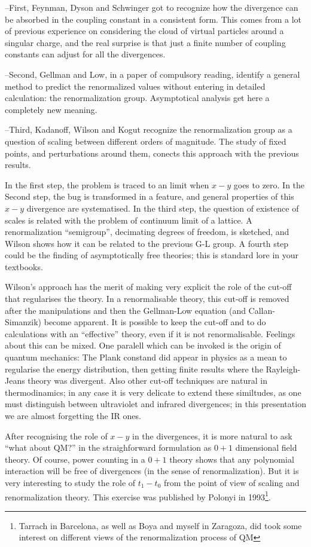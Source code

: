 \documentclass[a4paper,a4paper]{article}
\begin{document}
--First, Feynman, Dyson and Schwinger got to recognize how the divergence can be 
absorbed in the coupling constant in a consistent form. This comes from a lot of
previous experience on considering the cloud of virtual particles around a 
singular charge, and the real surprise is that just a finite number of coupling
constants can adjust for all the divergences.

--Second, Gellman and Low\cite{gl}, in a paper of compulsory reading, identify a general 
method to predict the renormalized values without entering in detailed calculation: the 
renormalization group. Asymptotical analysis get here a completely new meaning.

--Third, Kadanoff, Wilson and Kogut recognize the renormalization group as a question of 
scaling between different orders of magnitude. The study of fixed points, and perturbations
around them, conects this approach  with the previous results. 

In the first step, the problem is traced to an limit when $x-y$ goes to zero. In the Second 
step, the bug is transformed in a feature, and general properties of this $x-y$ divergence are 
systematised. In the third step, the question of existence of scales is related with the 
problem of continuum limit of a lattice. A renormalization ``semigroup'', decimating degrees 
of freedom, is sketched, and Wilson shows how it can be related to the previous G-L group. 
A fourth step could be the finding of asymptotically free theories; this is standard lore in 
your textbooks. 

Wilson's approach has the merit of making very explicit the role of the cut-off that
regularises the theory. In a renormalisable theory, this cut-off is removed after
the  manipulations and then the Gellman-Low equation (and Callan-Simanzik) become apparent.
It is possible to keep the cut-off and to do calculations with an ``effective'' theory,
even if it is not renormalisable. Feelings about this can be mixed. One paralell which
can be invoked is the origin of quantum mechanics: The Plank constand did appear in
physics as a mean to regularise the energy distribution, then getting finite results
where the Rayleigh-Jeans theory was divergent. Also other cut-off techniques are
natural in thermodinamics; in any case it is very delicate to extend these similtudes,
as one must distinguish between ultraviolet and infrared divergences; in this presentation
we are almost forgetting the IR ones.
 
After recognising the role of $x-y$ in the divergences, it is more natural to ask ``what about 
QM?'' in the straighforward formulation as $0+1$ dimensional field theory. Of course, power
 counting in a $0+1$ theory shows that any polynomial interaction 
will be free of divergences (in the sense of renormalization). But it is very interesting to 
study the role of $t_1-t_0$  from the point of view of scaling and renormalization theory. This 
exercise was published by Polonyi\cite{polonyi} in 1993\footnote{Tarrach in Barcelona, 
as well as Boya and myself in Zaragoza, did took some interest on different views of the 
renormalization process of QM}.
\end{document}
